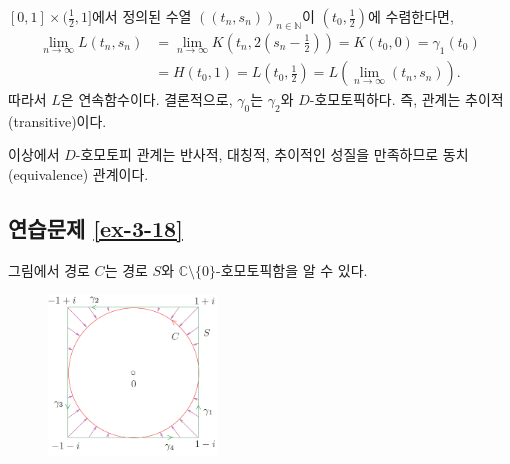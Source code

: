 $[0,1]\times (\frac12,1]$에서 정의된 수열 $((t_n, s_n))_{n\in\mathbb N}$이
$(t_0,\frac12)$에 수렴한다면,
\begin{align*}
\lim_{n\to\infty} L(t_n, s_n)
& = \lim_{n\to\infty} K\left( t_n, 2(s_n - \frac12)\right)
= K(t_0,0) = \gamma_1(t_0) \\
&= H(t_0,1) = L\left( t_0, \frac12\right) = L\left( \lim_{n\to\infty} (t_n, s_n) \right).
\end{align*}
따라서 $L$은 연속함수이다.
결론적으로, $\gamma_0$는 $\gamma_2$와 $D$-호모토픽하다.
즉, 관계는 추이적(transitive)이다.

이상에서 $D$-호모토피 관계는 반사적, 대칭적, 추이적인 성질을 만족하므로
동치(equivalence) 관계이다.

\subsection*{연습문제 \ref{ex-3-18}}

그림에서 경로 $C$는 경로 $S$와 $\mathbb C\setminus \{0\}$-호모토픽함을 알 수 있다.

\begin{figure}[h!]
\begin{center}
\includegraphics[width=0.4\textwidth]{./figs/fig-s-0-9}
\end{center}
\end{figure}

